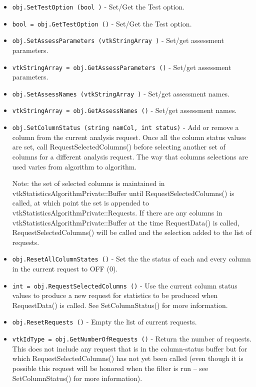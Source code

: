 \begin{itemize}
\item  \verb|obj.SetTestOption (bool )| -  Set/Get the Test option.

\item  \verb|bool = obj.GetTestOption ()| -  Set/Get the Test option.

\item  \verb|obj.SetAssessParameters (vtkStringArray )| -  Set/get assessment parameters.

\item  \verb|vtkStringArray = obj.GetAssessParameters ()| -  Set/get assessment parameters.

\item  \verb|obj.SetAssessNames (vtkStringArray )| -  Set/get assessment names.

\item  \verb|vtkStringArray = obj.GetAssessNames ()| -  Set/get assessment names.

\item  \verb|obj.SetColumnStatus (string namCol, int status)| -  Add or remove a column from the current analysis request.
 Once all the column status values are set, call RequestSelectedColumns()
 before selecting another set of columns for a different analysis request.
 The way that columns selections are used varies from algorithm to algorithm.

 Note: the set of selected columns is maintained in vtkStatisticsAlgorithmPrivate::Buffer
 until RequestSelectedColumns() is called, at which point the set is appended
 to vtkStatisticsAlgorithmPrivate::Requests.
 If there are any columns in vtkStatisticsAlgorithmPrivate::Buffer at the time
 RequestData() is called, RequestSelectedColumns() will be called and the
 selection added to the list of requests.

\item  \verb|obj.ResetAllColumnStates ()| -  Set the the status of each and every column in the current request to OFF (0).

\item  \verb|int = obj.RequestSelectedColumns ()| -  Use the current column status values to produce a new request for statistics
 to be produced when RequestData() is called. See SetColumnStatus() for more information.

\item  \verb|obj.ResetRequests ()| -  Empty the list of current requests.

\item  \verb|vtkIdType = obj.GetNumberOfRequests ()| -  Return the number of requests.
 This does not include any request that is in the column-status buffer
 but for which RequestSelectedColumns() has not yet been called (even though
 it is possible this request will be honored when the filter is run -- see SetColumnStatus()
 for more information).


\end{itemize}
